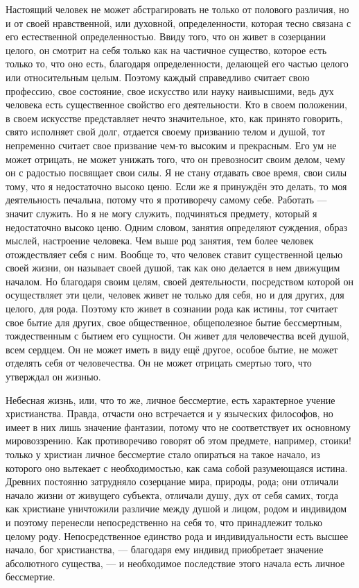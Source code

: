 \documentclass[12pt,oneside]{book}
\begin{document}
Настоящий человек не может абстрагировать не только от полового различия, но и от своей нравственной, или духовной, определенности, которая тесно связана с его естественной определенностью. Ввиду того, что он живет в созерцании целого, он смотрит на себя только как на частичное существо, которое есть только то, что оно есть, благодаря определенности, делающей его частью целого или относительным целым. Поэтому каждый справедливо считает свою профессию, свое состояние, свое искусство или науку наивысшими, ведь дух человека есть существенное свойство его деятельности. Кто в своем положении, в своем искусстве представляет нечто значительное, кто, как принято говорить, свято исполняет свой долг, отдается своему призванию телом и душой, тот непременно считает свое призвание чем-то высоким и прекрасным. Его ум не может отрицать, не может унижать того, что он превозносит своим делом, чему он с радостью посвящает свои силы. Я не стану отдавать свое время, свои силы тому, что я недостаточно высоко ценю. Если же я принуждён это делать, то моя деятельность печальна, потому что я противоречу самому себе. Работать --- значит служить. Но я не могу служить, подчиняться предмету, который я недостаточно высоко ценю. Одним словом, занятия определяют суждения, образ мыслей, настроение человека. Чем выше род занятия, тем более человек отождествляет себя с ним. Вообще то, что человек ставит существенной целью своей жизни, он называет своей душой, так как оно делается в нем движущим началом. Но благодаря своим целям, своей деятельности, посредством которой он осуществляет эти цели, человек живет не только для себя, но и для других, для целого, для рода. Поэтому кто живет в сознании рода как истины, тот считает свое бытие для других, свое общественное, общеполезное бытие бессмертным, тождественным с бытием его сущности. Он живет для человечества всей душой, всем сердцем. Он не может иметь в виду ещё другое, особое бытие, не может отделять себя от человечества. Он не может отрицать смертью того, что утверждал он жизнью.


Небесная жизнь, или, что то же, личное бессмертие, есть характерное учение христианства. Правда, отчасти оно встречается и у языческих философов, но имеет в них лишь значение фантазии, потому что не соответствует их основному мировоззрению. Как противоречиво говорят об этом предмете, например, стоики! только у христиан личное бессмертие стало опираться на такое начало, из которого оно вытекает с необходимостью, как сама собой разумеющаяся истина. Древних постоянно затрудняло созерцание мира, природы, рода; они отличали начало жизни от живущего субъекта, отличали душу, дух от себя самих, тогда как христиане уничтожили различие между душой и лицом, родом и индивидом и поэтому перенесли непосредственно на себя то, что принадлежит только целому роду. Непосредственное единство рода и индивидуальности есть высшее начало, бог христианства, --- благодаря ему индивид приобретает значение абсолютного существа, --- и необходимое последствие этого начала есть личное бессмертие.
\end{document}
